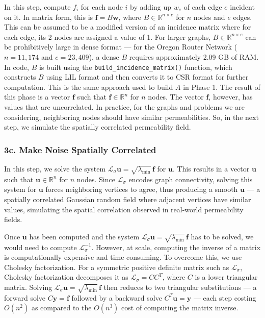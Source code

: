 \documentclass[a4paper,12pt]{amsart}
\numberwithin{equation}{section}
\renewcommand{\L}{{\mathcal L}}
\begin{document}
In this step, compute $f_i$ for each node $i$ by adding up $w_e$ of 
each edge $e$ incident on it. In matrix form, this is $\mathbf{f} = B\mathbf{w}$, where 
$B \in \mathbb{R}^{n \times e}$ for $n$ nodes and $e$ edges. This can 
be assumed to be a modified version of an incidence matrix where for 
each edge, its 2 nodes are assigned a value of 1. For larger graphs, 
$B \in \mathbb{R}^{n \times e}$ can be prohibitively large in dense 
format — for the Oregon Router Network ($n = 11{,}174$ and 
$e = 23{,}409$), a dense $B$ requires approximately 2.09 GB of RAM. In 
code, $B$ is built using the \texttt{build\_incidence\_matrix()} 
function, which constructs $B$ using LIL format and then converts it 
to CSR format for further computation. This is the same approach used 
to build $A$ in Phase 1. The result of this phase is a vector $\mathbf{f}$ such 
that $\mathbf{f} \in \mathbb{R}^n$ for $n$ nodes. The vector $\mathbf{f}$, however, has 
values that are uncorrelated. In practice, for the graphs and problems we are considering, neighboring nodes should have similar permeabilities. So, in the next 
step, we simulate the spatially correlated permeability field.

\subsubsection{3c. Make Noise Spatially Correlated}

In this step, we solve the system 
$\L_\sigma \mathbf{u} = \sqrt{\lambda_{\min}} \, \mathbf{f}$ for $\mathbf{u}$. This results in a 
vector $\mathbf{u}$ such that $\mathbf{u} \in \mathbb{R}^n$ for $n$ nodes. Since 
$\L_\sigma$ encodes graph connectivity, solving this system for $\mathbf{u}$ 
forces neighboring vertices to agree, thus producing a smooth $\mathbf{u}$ — a 
spatially correlated Gaussian random field where adjacent vertices 
have similar values, simulating the spatial correlation observed in 
real-world permeability fields.

Once $\mathbf{u}$ has been computed and the system 
$\L_\sigma \mathbf{u} = \sqrt{\lambda_{\min}} \, \mathbf{f}$ has to be solved, we would need 
to compute $\L_\sigma^{-1}$. However, at scale, computing the inverse 
of a matrix is computationally expensive and time consuming. To 
overcome this, we use Cholesky factorization. For a symmetric positive 
definite matrix such as $\L_\sigma$, Cholesky factorization decomposes 
it as $\L_\sigma = CC^T$, where $C$ is a lower triangular matrix. 
Solving $\L_\sigma \mathbf{u} = \sqrt{\lambda_{\min}} \, \mathbf{f}$ then reduces to two 
triangular substitutions — a forward solve $C\mathbf{y} = \mathbf{f}$ followed by a 
backward solve $C^T \mathbf{u} = \mathbf{y}$ — each step costing $O(n^2)$ as compared to 
the $O(n^3)$ cost of computing the matrix inverse.
\end{document}
